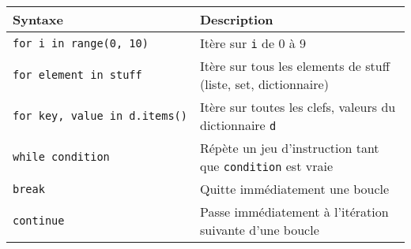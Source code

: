 \documentclass[]{article}
\begin{document}
\begin{longtable}[]{@{}ll@{}}
\toprule
\begin{minipage}[b]{0.30\columnwidth}\raggedright
Syntaxe\strut
\end{minipage} & \begin{minipage}[b]{0.64\columnwidth}\raggedright
Description\strut
\end{minipage}\tabularnewline
\midrule
\endhead
\begin{minipage}[t]{0.30\columnwidth}\raggedright
\texttt{for\ i\ in\ range(0,\ 10)}\strut
\end{minipage} & \begin{minipage}[t]{0.64\columnwidth}\raggedright
Itère sur \texttt{i} de 0 à 9\strut
\end{minipage}\tabularnewline
\begin{minipage}[t]{0.30\columnwidth}\raggedright
\texttt{for\ element\ in\ stuff}\strut
\end{minipage} & \begin{minipage}[t]{0.64\columnwidth}\raggedright
Itère sur tous les elements de stuff (liste, set, dictionnaire)\strut
\end{minipage}\tabularnewline
\begin{minipage}[t]{0.30\columnwidth}\raggedright
\texttt{for\ key,\ value\ in\ d.items()}\strut
\end{minipage} & \begin{minipage}[t]{0.64\columnwidth}\raggedright
Itère sur toutes les clefs, valeurs du dictionnaire \texttt{d}\strut
\end{minipage}\tabularnewline
\begin{minipage}[t]{0.30\columnwidth}\raggedright
\texttt{while\ condition}\strut
\end{minipage} & \begin{minipage}[t]{0.64\columnwidth}\raggedright
Répète un jeu d'instruction tant que \texttt{condition} est vraie\strut
\end{minipage}\tabularnewline
\begin{minipage}[t]{0.30\columnwidth}\raggedright
\texttt{break}\strut
\end{minipage} & \begin{minipage}[t]{0.64\columnwidth}\raggedright
Quitte immédiatement une boucle\strut
\end{minipage}\tabularnewline
\begin{minipage}[t]{0.30\columnwidth}\raggedright
\texttt{continue}\strut
\end{minipage} & \begin{minipage}[t]{0.64\columnwidth}\raggedright
Passe immédiatement à l'itération suivante d'une boucle\strut
\end{minipage}\tabularnewline
\bottomrule
\end{longtable}
\end{document}
